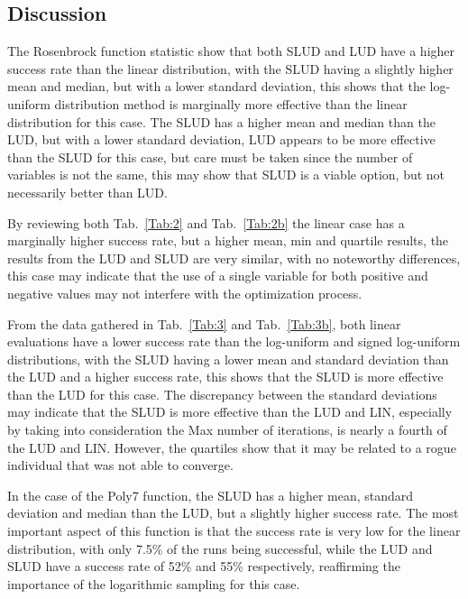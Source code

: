 \documentclass[10pt,fleqn,a4paper,twoside]{article}
\begin{document}
\subsection{Discussion}

The Rosenbrock function statistic show that both SLUD and LUD have a higher success rate than the linear distribution, with the SLUD having a slightly higher mean and median, but with a lower standard deviation, 
this shows that the log-uniform distribution method is marginally more effective than the linear distribution for this case. The SLUD has a higher mean and median than the LUD, but with a lower standard deviation, 
LUD appears to be more effective than the SLUD for this case, but care must be taken since the number of variables is not the same, this may show that SLUD is a viable option, but not necessarily better than LUD.


By reviewing both Tab.~\ref{Tab:2} and Tab.~\ref{Tab:2b} the linear case has a marginally higher success rate, but a higher mean, min and 
quartile results, the results from the LUD and SLUD are very similar, with no noteworthy differences, this case may indicate that
the use of a single variable for both positive and negative values may not interfere with the optimization process.


From the data gathered in Tab.~\ref{Tab:3} and Tab.~\ref{Tab:3b}, both linear evaluations have a lower success rate than the log-uniform and signed log-uniform distributions, with the SLUD having a
lower mean and standard deviation than the LUD and a higher success rate, this shows that the SLUD is more effective than the LUD for this case. The discrepancy between the standard deviations
may indicate that the SLUD is more effective than the LUD and LIN, especially by taking into consideration the Max number of iterations, is nearly a fourth of the LUD and LIN. However, the
quartiles show that it may be related to a rogue individual that was not able to converge.

In the case of the Poly7 function, the SLUD has a higher mean, standard deviation and median than the LUD, but a slightly higher success rate. The most important aspect of this function is that the
success rate is very low for the linear distribution, with only 7.5\% of the runs being successful, while the LUD and SLUD have a success rate of 52\% and 55\% respectively, reaffirming the importance
of the logarithmic sampling for this case.
\end{document}
